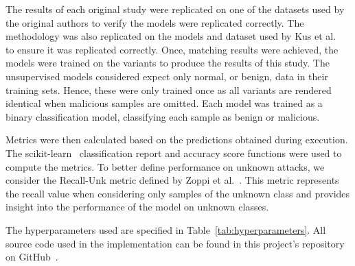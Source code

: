 The results of each original study were replicated on one of the datasets used
by the original authors to verify the models were replicated correctly. The
methodology was also replicated on the models and dataset used by Kus et
al.~\cite{Kus} to ensure it was replicated correctly. Once, matching results
were achieved, the models were trained on the variants to produce the results
of this study. The unsupervised models considered expect only normal, or
benign, data in their training sets. Hence, these were only trained once as all
variants are rendered identical when malicious samples are omitted. Each model
was trained as a binary classification model, classifying each sample as benign
or malicious.

Metrics were then calculated based on the predictions obtained during
execution. The scikit-learn~\cite{scikit-learn} classification report and
accuracy score functions were used to compute the metrics. To better define
performance on unknown attacks, we consider the Recall-Unk metric defined by
Zoppi et al.~\cite{Zoppi}. This metric represents the recall value when
considering only samples of the unknown class and provides insight into the
performance of the model on unknown classes.


The hyperparameters used are specified in Table~\ref{tab:hyperparameters}. All
source code used in the implementation can be found in this project's
repository on GitHub~\cite{repo}.

